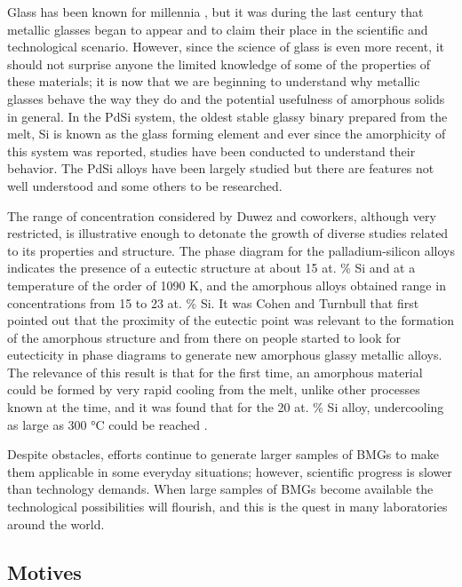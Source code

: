 \documentclass[fleqn,12pt]{wlscirep}
\begin{document}
Glass has been known for millennia \cite{Handbook_2019}, but it was during the last century that metallic glasses began to appear and to claim their place in the scientific and technological scenario. However, since the science of glass is even more recent, it should not surprise anyone the limited knowledge of some of the properties of these materials; it is now that we are beginning to understand why metallic glasses behave the way they do and the potential usefulness of amorphous solids in general. In the PdSi system, the oldest stable glassy binary prepared from the melt, Si is known as the glass forming element and ever since the amorphicity of this system was reported, studies have been conducted to understand their behavior. The PdSi alloys have been largely studied but there are features not well understood and some others to be researched.

The range of concentration considered by Duwez and coworkers, although very restricted, is illustrative enough to detonate the growth of diverse studies related to its properties and structure. The phase diagram for the palladium-silicon alloys indicates the presence of a eutectic structure at about 15 at. \% Si and at a temperature of the order of 1090 K, and the amorphous alloys obtained range in concentrations from 15 to 23 at. \% Si. It was Cohen and Turnbull that first pointed out that the proximity of the eutectic point was relevant to the formation of the amorphous structure \cite{Cohen_1961, Turnbull_1969} and from there on people started to look for eutecticity in phase diagrams to generate new amorphous glassy metallic alloys. The relevance of this result is that for the first time, an amorphous material could be formed by very rapid cooling from the melt, unlike other processes known at the time, and it was found that for the 20 at. \% Si alloy, undercooling as large as 300 °C could be reached \cite{Duwez_1965}. 

Despite obstacles, efforts continue to generate larger samples of BMGs to make them applicable in some everyday situations; however, scientific progress is slower than technology demands. When large samples of BMGs become available the technological possibilities will flourish, and this is the quest in many laboratories around the world.

\subsection*{Motives}
\end{document}
